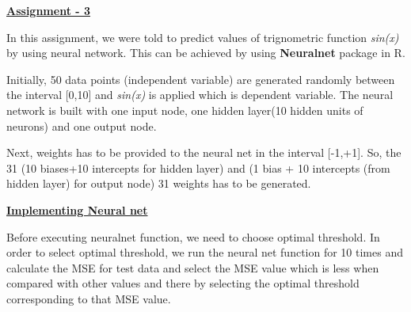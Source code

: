 \documentclass[a4paper,10pt]{article}
\begin{document}
\textbf{\underline{Assignment - 3}} \par
In this assignment, we were told to predict values of trignometric function \textit{sin(x)} by using neural network.
This can be achieved by using \textbf{Neuralnet} package in R. \par
Initially, 50 data points (independent variable) are generated randomly between the interval [0,10] and \textit{sin(x)} is applied which is 
dependent variable. The neural network is built with one input node, one hidden layer(10 hidden units of neurons) and 
one output node. \par
Next, weights has to be provided to the neural net in the interval [-1,+1]. So, the 31 (10 biases+10 intercepts for hidden layer) 
and (1 bias + 10 intercepts (from hidden layer) for output node) 31 weights has to be generated. \par
\textbf{\underline{Implementing Neural net}} \par
Before executing neuralnet function, we need to choose optimal threshold. In order to select optimal threshold, we run the 
neural net function for 10 times and calculate the MSE for test data and select the MSE value which is less when compared
with other values and there by selecting the optimal threshold corresponding to that MSE value.
\end{document}
